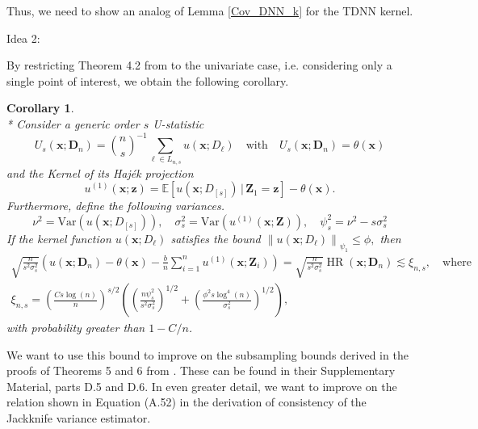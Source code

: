 \documentclass[letterpaper,10pt]{article}
\numberwithin{equation}{section}
\numberwithin{thm}{section}
\numberwithin{lem}{section}
\newtheorem{cor}{Corollary}
\numberwithin{cor}{section}
\newcommand{\E}{\mathbb{E}}
\newcommand{\1}{\mathbbm{1}}
\newcommand{\Var}{\text{Var}}
\begin{document}
Thus, we need to show an analog of Lemma \ref{Cov_DNN_k} for the TDNN kernel.

	{\color{red} Idea 2:}

By restricting Theorem 4.2 from \citet{ritzwoller_uniform_2024} to the univariate case, i.e. considering only a single point of interest, we obtain the following corollary.
\begin{cor}\mbox{}\\*
	Consider a generic order $s$ U-statistic
	\begin{equation}
		U_{s}(\mathbf{x}; \mathbf{D}_n)
		= \binom{n}{s}^{-1} \sum_{\ell \in L_{n,s}}u(\mathbf{x}; D_{\ell})
		\quad \text{with} \quad
		U_{s}(\mathbf{x}; \mathbf{D}_n) = \theta(\mathbf{x})
	\end{equation}
	and the Kernel of its Haj\'ek projection
	\begin{equation}
		u^{(1)}\left(\mathbf{x}; \mathbf{z}\right)
		= \E\left[u(\mathbf{x}; D_{[s]}) \, | \, \mathbf{Z}_1 = \mathbf{z}\right] - \theta(\mathbf{x}).
	\end{equation}
	Furthermore, define the following variances.
	\begin{equation}
		\nu^2 = \Var\left(u(\mathbf{x}; D_{[s]})\right), \quad
		\sigma_{s}^2 = \Var\left(u^{(1)}(\mathbf{x}; \mathbf{Z})\right), \quad
		\psi_{s}^2 = \nu^2 - s \sigma_{s}^2
	\end{equation}
	If the kernel function $u\left(\mathbf{x} ; D_{\ell}\right)$ satisfies the bound
	$\left\|u(\mathbf{x}; D_{\ell})\right\|_{\psi_1} \leq \phi,$
	then
	\begin{align}
		\sqrt{\frac{n}{{s}^2 \sigma_{s}^2}}
		\left(u(\mathbf{x}; \mathbf{D}_n) - \theta(\mathbf{x}) - \frac{b}{n} \sum_{i=1}^n u^{(1)}(\mathbf{x}; \mathbf{Z}_{i})\right)
		= \sqrt{\frac{n}{{s}^2 \sigma_{s}^2}} \operatorname{HR}(\mathbf{x}; \mathbf{D}_n)
		\lesssim \xi_{n, s},
		\quad \text {where} \\
		\xi_{n, s}
		= \left(\frac{C s \log(n)}{n}\right)^{s / 2}\left(\left(\frac{n \psi_{s}^2}{{s}^2 \sigma_{s}^2}\right)^{1 / 2}+\left(\frac{\phi^2 s \log ^4(n)}{\sigma_{s}^2}\right)^{1 / 2}\right),
	\end{align}
	with probability greater than $1-C / n$.
\end{cor}

We want to use this bound to improve on the subsampling bounds derived in the proofs of Theorems 5 and 6 from \cite{demirkaya_optimal_2024}.
These can be found in their Supplementary Material, parts D.5 and D.6.
	{\color{red} In even greater detail, we want to improve on the relation shown in Equation (A.52) in the derivation of consistency of the Jackknife variance estimator.}
\end{document}
